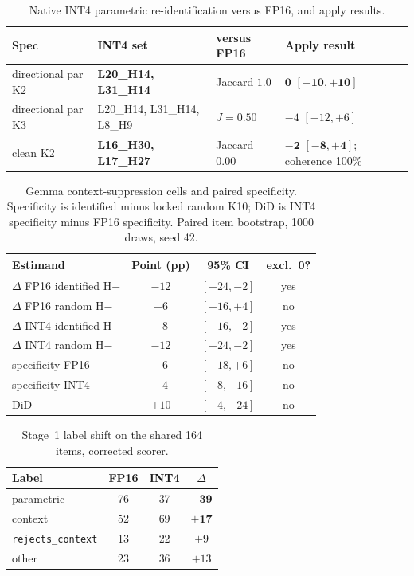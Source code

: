 \documentclass{article} %
\begin{document}
\begin{table}[h]
\caption{Native INT4 parametric re-identification versus FP16, and apply results.}
\label{tab:native-id}
\centering\footnotesize
\begin{tabular}{p{1.55in}p{1.25in}p{1.05in}p{1.35in}}
\toprule
Spec & INT4 set & versus FP16 & Apply result \\
\midrule
directional par K2 & \textbf{L20\_H14, L31\_H14} & Jaccard $\mathbf{1.0}$ & $\mathbf{0}$ $\mathbf{[-10,+10]}$ \\
directional par K3 & L20\_H14, L31\_H14, L8\_H9 & $J{=}0.50$ & $-4$ $[-12,+6]$ \\
clean K2 & \textbf{L16\_H30, L17\_H27} & Jaccard $\mathbf{0.00}$ & $\mathbf{-2}$ $\mathbf{[-8,+4]}$; coherence 100\% \\
\bottomrule
\end{tabular}
\end{table}

\begin{table}[h]
\caption{Gemma context-suppression cells and paired specificity. Specificity is identified minus locked random K10; DiD is INT4 specificity minus FP16 specificity. Paired item bootstrap, 1000 draws, seed 42.}
\label{tab:gemma-suppress-did}
\centering\footnotesize
\begin{tabular}{lccc}
\toprule
Estimand & Point (pp) & 95\% CI & excl.\ 0? \\
\midrule
$\Delta$ FP16 identified H$-$ & $-12$ & $[-24,-2]$ & yes \\
$\Delta$ FP16 random H$-$ & $-6$ & $[-16,+4]$ & no \\
$\Delta$ INT4 identified H$-$ & $-8$ & $[-16,-2]$ & yes \\
$\Delta$ INT4 random H$-$ & $-12$ & $[-24,-2]$ & yes \\
specificity FP16 & $-6$ & $[-18,+6]$ & no \\
specificity INT4 & $+4$ & $[-8,+16]$ & no \\
DiD & $+10$ & $[-4,+24]$ & no \\
\bottomrule
\end{tabular}
\end{table}

\begin{table}[h]
\caption{Stage~1 label shift on the shared 164 items, corrected scorer.}
\label{tab:labels}
\centering\small
\begin{tabular}{lccc}
\toprule
Label & FP16 & INT4 & $\Delta$ \\
\midrule
parametric & 76 & 37 & $\mathbf{-39}$ \\
context & 52 & 69 & $\mathbf{+17}$ \\
\texttt{rejects\_context} & 13 & 22 & $+9$ \\
other & 23 & 36 & $+13$ \\
\bottomrule
\end{tabular}
\end{table}
\end{document}
